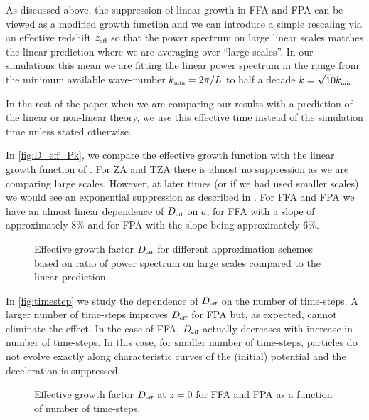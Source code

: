 As discussed above, the suppression of linear growth in FFA and FPA can be viewed as a modified growth function and we can introduce a simple rescaling via an effective redshift $z_\text{\tiny eff}$ so that the power spectrum on large linear scales matches the linear prediction
where we are averaging over ``large scales''. In our simulations this mean we are fitting the linear power spectrum in the range from the minimum available wave-number $k_\text{\tiny min}=2\pi/L$ to half a decade $k=\sqrt{10}k_\text{\tiny min}$.

In the rest of the paper when we are comparing our results with a prediction of the linear or non-linear theory, we use this effective time instead of the simulation time unless stated otherwise.

In \autoref{fig:D_eff_Pk}, we compare the effective growth function with the linear growth function of \LCDM. For ZA and TZA there is almost no suppression as we are comparing large scales. However, at later times (or if we had used smaller scales) we would see an exponential suppression as described in \cite{Bharadwaj_1996}. For FFA and FPA we have an almost linear dependence of $D_\text{\tiny eff}$ on $a$, for FFA with a slope of approximately $8\%$ and for FPA with the slope being approximately $6\%$.
\begin{figure}[bt]
  \centering
    \begin{subfigure}{0.9\textwidth}
	\end{subfigure}
	\begin{subfigure}{0.9\textwidth}
	\end{subfigure}
  \caption{Effective growth factor $D_\text{\tiny eff}$ for different approximation schemes based on ratio of power spectrum on large scales compared to the linear prediction.}
  \label{fig:D_eff_Pk}
\end{figure}

In \autoref{fig:timestep} we study the dependence of $D_\text{\tiny eff}$ on the number of time-steps. A larger number of time-steps improves $D_\text{\tiny eff}$ for FPA but, as expected, cannot eliminate the effect. In the case of FFA, $D_\text{\tiny eff}$ actually decreases with increase in number of time-steps. In this case, for smaller number of time-steps, particles do not evolve exactly along characteristic curves of the (initial) potential and the deceleration is suppressed.
\begin{figure}[bt]
  \centering
    \begin{subfigure}{0.9\textwidth}
	\end{subfigure}
	\begin{subfigure}{0.9\textwidth}
	\end{subfigure}
  \caption{Effective growth factor $D_\text{\tiny eff}$ at $z=0$ for FFA and FPA as a function of number of time-steps.}
  \label{fig:timestep}
\end{figure}

